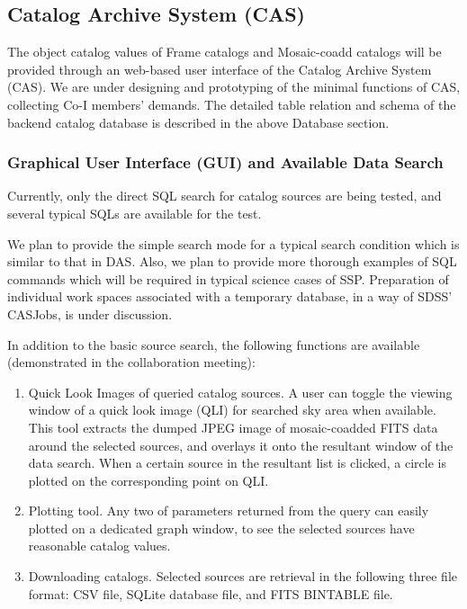 \documentclass[12pt]{article}
\begin{document}
\subsection{Catalog Archive System (CAS)}
The object catalog values of Frame catalogs and Mosaic-coadd catalogs
will be provided through an web-based user interface of the Catalog Archive
System (CAS). 
We are under designing and prototyping of the minimal functions of CAS,
collecting Co-I members' demands. 
The detailed table relation and schema of the backend
catalog database is described in the above Database section.

\subsubsection{Graphical User Interface (GUI) and Available Data Search}
Currently, only the direct SQL search for catalog sources are
being tested, and several typical SQLs are available for the test. 

We plan to provide the simple search mode for a typical
search condition which is similar to that in DAS. 
Also, we plan to provide more thorough examples of SQL commands which will 
be required in typical science cases of SSP.
Preparation of individual work spaces associated with a temporary
database, in a way of SDSS' CASJobs, is under discussion.

In addition to the basic source search, the following functions are
available (demonstrated in the collaboration meeting):
\begin{enumerate}
\item Quick Look Images of queried catalog sources. A user can toggle the
     viewing window of a quick look image (QLI) for searched sky area when
     available. This tool extracts the dumped JPEG image of
     mosaic-coadded FITS data around the selected sources, and overlays
     it onto the resultant window of the data search. When a certain
     source in the resultant list is clicked, a circle is plotted on
     the corresponding point on QLI. 
\item Plotting tool. Any two of parameters returned from the query can
     easily plotted on a dedicated graph window, to see the selected
     sources have reasonable catalog values.
\item Downloading catalogs. Selected sources are retrieval in the
     following three file format: CSV file, SQLite database file, and
     FITS BINTABLE file.
\end{enumerate}
\end{document}
